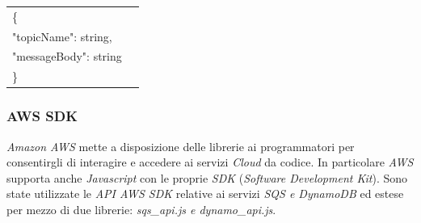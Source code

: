 \documentclass{article}
\begin{document}
\begin{tabular}{ll}
\{\\	   
           \hspace{10mm} "topicName": string, \\
           \hspace{10mm} "messageBody": string
\\
\}
\end{tabular}

\subsubsection{AWS SDK}
\textit{Amazon AWS} mette a disposizione delle librerie ai programmatori per consentirgli di interagire e accedere ai servizi \textit{Cloud} da codice. In particolare \textit{AWS} supporta anche \textit{Javascript} con le proprie \textit{SDK} (\textit{Software Development Kit}). Sono state utilizzate le \textit{API AWS SDK} relative ai servizi \textit{SQS e DynamoDB} ed estese per mezzo di due librerie: \textit{sqs\_api.js e dynamo\_api.js}.\\
\end{document}
